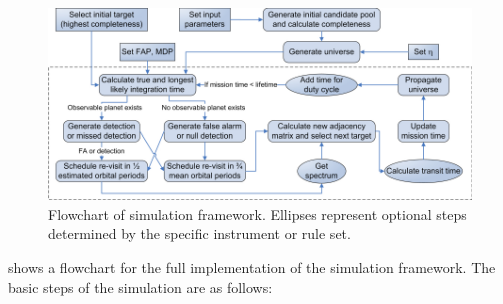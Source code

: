 \begin{figure}[ht]
\centering
   \includegraphics[width = 6in]{./figures/simFlowchart}
 \caption[Simulation Flowchart]{ \label{fig:flowchart} Flowchart of simulation framework.  Ellipses represent optional steps determined by the specific instrument or rule set.}
 \end{figure}
 shows a flowchart for the full implementation of the simulation framework.  The basic steps of the simulation are as follows:
